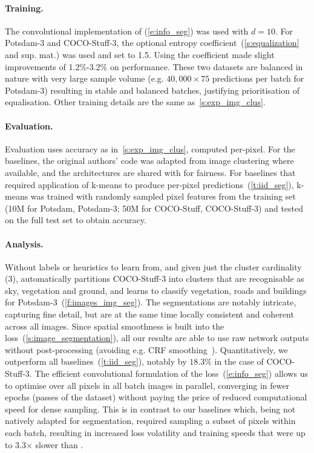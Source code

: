 \paragraph{Training.}
The convolutional implementation of \methodnameshort (\cref{e:info_seg}) was used with $d=10$. For Potsdam-3 and COCO-Stuff-3, the optional entropy coefficient~(\cref{s:equalization} and sup. mat.) was used and set to 1.5. Using the coefficient made slight improvements of 1.2\%-3.2\% on performance. These two datasets are balanced in nature with very large sample volume (e.g. $40,000 \times 75$ predictions per batch for Potsdam-3) resulting in stable and balanced batches, justifying prioritisation of equalisation. Other training details are the same as~\cref{s:exp_img_clus}.

\paragraph{Evaluation.}
Evaluation uses accuracy as in~\cref{s:exp_img_clus}, computed per-pixel.
For the baselines, the original authors' code was adapted from image clustering where available, and the architectures are shared with \methodnameshort for fairness. For baselines that required application of k-means to produce per-pixel predictions~(\cref{t:iid_seg}), k-means was trained with randomly sampled pixel features from the training set (10M for Potsdam, Potsdam-3; 50M for COCO-Stuff, COCO-Stuff-3) and tested on the full test set to obtain accuracy.

\paragraph{Analysis.}
 Without labels or heuristics to learn from, and given just the cluster cardinality (3), \methodnameshort automatically partitions COCO-Stuff-3 into clusters that are recognisable as sky, vegetation and ground, and learns to classify vegetation, roads and buildings for Potsdam-3~(\cref{f:images_img_seg}). The segmentations are notably intricate, capturing fine detail, but are at the same time locally consistent and coherent across all images. Since spatial smoothness is built into the loss~(\cref{s:image_segmentation}), all our results are able to use raw network outputs without post-processing (avoiding e.g. CRF smoothing~\cite{chen2018deeplab}). Quantitatively, we outperform all baselines~(\cref{t:iid_seg}), notably by $18.3\%$ in the case of COCO-Stuff-3. The efficient convolutional formulation of the loss~(\cref{e:info_seg}) allows us to optimise over all pixels in all batch images in parallel, converging in fewer epochs (passes of the dataset) without paying the price of reduced computational speed for dense sampling. This is in contrast to our baselines which, being not natively adapted for segmentation, required sampling a subset of pixels within each batch, resulting in increased loss volatility and training speeds that were up to 3.3$\times$ slower than \methodnameshort.


